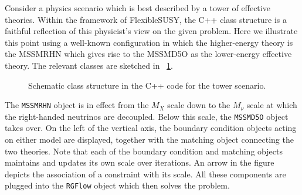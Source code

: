 \documentclass[final,3p,11pt,pdflatex]{elsarticle}
\makeatletter
\newcommand{\fs}{FlexibleSUSY\@\xspace}
\newcommand{\code}[1]{\lstinline|#1|}  %
\newcommand{\figref}[1]{\figurename~\ref{#1}}
\makeatother
\begin{document}
Consider a physics scenario which is best described
by a tower of effective theories.
Within the framework of \fs, the C++ class structure is
a faithful reflection of
this physicist's view on the given problem.
Here we illustrate this point
using a well-known configuration in which
the higher-energy theory is the MSSMRHN which
gives rise to the MSSMD5O as the lower-energy effective theory.
The relevant classes are sketched
in \figref{fig:class structure for tower}.
\begin{figure}
  \centering
{}
  \caption{Schematic class structure in the C++ code for
    the tower scenario.}
  \label{fig:class structure for tower}
\end{figure}
The \code{MSSMRHN} object is in effect from the $M_X$ scale down to
the $M_\nu$ scale at which the right-handed neutrinos are decoupled.
Below this scale, the \code{MSSMD5O} object takes over.
On the left of the vertical axis,
the boundary condition objects acting on either model are displayed,
together with the matching object connecting the two theories.
Note that each of the boundary condition and matching objects
maintains and updates its own scale over iterations.
An arrow in the figure depicts
the association of a constraint with its scale.
All these components are plugged into the \code{RGFlow} object
which then solves the problem.
\end{document}
